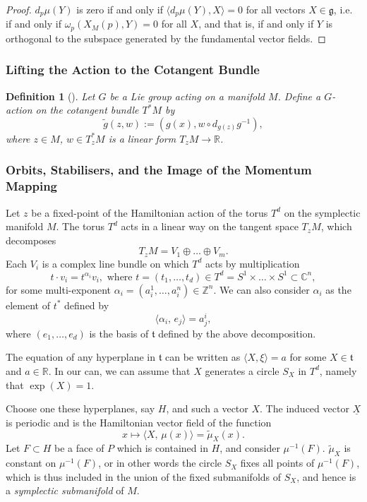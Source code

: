 \documentclass{article}
\newtheorem{defn}[theorem]{Definition\rm}
\newcommand{\ra}{\rightarrow}
\newcommand{\w}{\omega}
\newcommand{\RR}{\mathbb{R}}
\newcommand{\CC}{\mathbb{C}}
\newcommand{\ZZ}{\mathbb{Z}}
\newcommand{\mfg}{\mathfrak{g}}
\newcommand{\mft}{\mathfrak{t}}
\begin{document}
	\begin{proof}
		$d_{p}\mu(Y)$ is zero if and only if $\langle d_{p}\mu(Y), X \rangle = 0$ for all vectors $X \in \mfg$, i.e. if and only if $\w_{p}(X_{M}(p), Y) = 0$ for all $X$, and that is, if and only if $Y$ is orthogonal to the subspace generated by the fundamental vector fields.
	\end{proof}

	\subsubsection{Lifting the Action to the Cotangent Bundle}
	
	\begin{defn}[\cite{Audin1997}]
		Let $G$ be a Lie group acting on a manifold $M$. Define a $G$-action on the cotangent bundle $T^{\ast}M$ by
		\[
			\tilde{g}(z,w) := (g(x), w \circ d_{g(z)}g^{-1}),
		\]
		where $z \in M$, $w \in T_{z}^{\ast}M$ is a linear form $T_{z}M \ra \RR$.
	\end{defn}

	\subsubsection{Orbits, Stabilisers, and the Image of the Momentum Mapping}
	
	Let $z$ be a fixed-point of the Hamiltonian action of the torus $T^{d}$ on the symplectic manifold $M$. The torus $T^{d}$ acts in a linear way on the tangent space $T_{z}M$, which decomposes
	\[
		T_{z}M = V_{1} \oplus \ldots \oplus V_{m}.
	\]
	Each $V_{i}$ is a complex line bundle on which $T^{d}$ acts by multiplication
	\[
		t \cdot v_{i} = t^{\alpha_{i}}v_{i}, \text{ where } t = (t_{1}, \ldots, t_{d}) \in T^{d} = S^{1} \times \ldots \times S^{1} \subset \CC^{n},
	\]
	for some multi-exponent $\alpha_{i} = (a_{i}^{1}, \ldots, a_{i}^{n}) \in \ZZ^{n}$. We can also consider $\alpha_{i}$ as the element of $t^{\ast}$ defined by
	\[
		\langle \alpha_{i},\, e_{j} \rangle = a_{j}^{i},
	\]
	where $(e_{1}, \ldots, e_{d})$ is the basis of $\mft$ defined by the above decomposition.
	
	The equation of any hyperplane in $\mft$ can be written as $\langle X, \xi \rangle = a$ for some $X \in \mft$ and $a \in \RR$. In our can, we can assume that $X$ generates a circle $S_{X}$ in $T^{d}$, namely that $\exp(X) = 1$.
	
	Choose one these hyperplanes, say $H$, and such a vector $X$. The induced vector $\underline{X}$ is periodic and is the Hamiltonian vector field of the function
	\[
		x \longmapsto \langle X,\, \mu(x) \rangle = \tilde{\mu}_{X}(x).
	\]
	Let $F \subset H$ be a face of $P$ which is contained in $H$, and consider $\mu^{-1}(F)$. $\tilde{\mu}_{X}$ is constant on $\mu^{-1}(F)$, or in other words the circle $S_{X}$ fixes all points of $\mu^{-1}(F)$, which is thus included in the union of the fixed submanifolds of $S_{X}$, and hence is a \emph{symplectic submanifold} of $M$.
	
\end{document}
